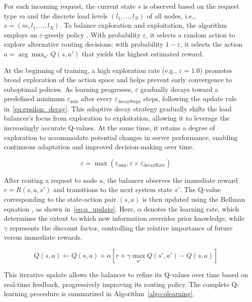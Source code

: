 \documentclass[lnbip]{svmultln}
\begin{document}
For each incoming request, the current state $s$ is observed based on the request type $m$ and the discrete load levels $(l_1, ..., l_N)$ of all nodes, i.e., $s = (m, l_1, ..., l_N)$. To balance exploration and exploitation, the algorithm employs an $\varepsilon$-greedy policy \cite{sutton1998}. With probability $\varepsilon$, it selects a random action to explore alternative routing decisions; with probability $1 - \varepsilon$, it selects the action $a = \arg\max_{a'} Q(s, a')$ that yields the highest estimated reward.

At the beginning of training, a high exploration rate (e.g., $\varepsilon = 1.0$) promotes broad exploration of the action space and helps prevent early convergence to suboptimal policies. As learning progresses, $\varepsilon$ gradually decays toward a predefined minimum $\varepsilon_\text{min}$ after every $\varepsilon_\text{decaySteps}$ steps, following the update rule in~\eqref{eq:epsilon_decay}.
This adaptive decay strategy gradually shifts the load balancer’s focus from exploration to exploitation, allowing it to leverage the increasingly accurate Q-values. At the same time, it retains a degree of exploration to accommodate potential changes in server performance, enabling continuous adaptation and improved decision-making over time.


\begin{equation}
    \varepsilon = \max(\varepsilon_\text{min}, \varepsilon \times \varepsilon_{\text{decayRate}})
    \label{eq:epsilon_decay}
\end{equation}

After routing a request to node \( a \), the balancer observes the immediate reward \( r = R(s, a, s') \) and transitions to the next system state \( s' \). The Q-value corresponding to the state-action pair \( (s, a) \) is then updated using the Bellman equation \cite{bellman1957}, as shown in~\eqref{eq:q_update}. Here, \( \alpha \) denotes the learning rate, which determines the extent to which new information overrides prior knowledge, while \( \gamma \) represents the discount factor, controlling the relative importance of future versus immediate rewards.

\begin{equation}
    Q(s, a) \gets Q(s, a) + \alpha \left[r + \gamma \max_{a'} Q(s', a') - Q(s, a)\right]
    \label{eq:q_update}
\end{equation}

This iterative update allows the balancer to refine its Q-values over time based on real-time feedback, progressively improving its routing policy. The complete Q-learning procedure is summarized in Algorithm~\ref{algo:qlearning}.
\end{document}
